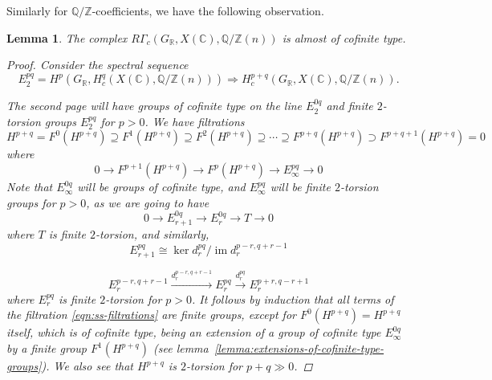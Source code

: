 \documentclass[leqno,12pt]{article}
\theoremstyle{plain}
\newtheorem{lemma}[theorem]{\indent\sc Lemma}
\theoremstyle{definition}
\DeclareMathOperator{\im}{im}
\newcommand{\CC}{\mathbb{C}}
\newcommand{\QQ}{\mathbb{Q}}
\newcommand{\RR}{\mathbb{R}}
\newcommand{\ZZ}{\mathbb{Z}}
\begin{document}
Similarly for $\QQ/\ZZ$-coefficients, we have the following observation.

\begin{lemma}
  \label{lemma:RGammac(GR,X(C),Q/Z(n))-almost-cofinite-type}
  The complex $R\Gamma_c (G_\RR, X (\CC), \QQ/\ZZ (n))$
  is almost of cofinite type.

  \begin{proof}
    Consider the spectral sequence
    \[ E_2^{pq} = H^p (G_\RR, H^q_c (X (\CC), \QQ/\ZZ (n)))
    \Longrightarrow
    H^{p+q}_c (G_\RR, X (\CC), \QQ/\ZZ (n)). \]

    The second page will have groups of cofinite type on the line $E_2^{0q}$ and
    finite $2$-torsion groups $E_2^{pq}$ for $p > 0$. We have filtrations
    \begin{equation}
      \label{eqn:ss-filtrations}
      H^{p+q} = F^0 (H^{p+q}) \supseteq
      F^1 (H^{p+q}) \supseteq
      F^2 (H^{p+q}) \supseteq \cdots \supseteq
      F^{p+q} (H^{p+q}) \supset F^{p+q+1} (H^{p+q}) = 0
    \end{equation}
    where
    $$0 \to F^{p+1} (H^{p+q}) \to F^p (H^{p+q}) \to E_\infty^{pq} \to 0$$
    Note that $E^{0q}_\infty$ will be groups of cofinite type, and
    $E^{pq}_\infty$ will be finite $2$-torsion groups for $p > 0$, as we are
    going to have
    $$0 \to E_{r+1}^{0q} \to E_r^{0q} \to T \to 0$$
    where $T$ is finite $2$-torsion, and similarly,
    $$E_{r+1}^{pq} \cong \ker d_r^{pq} / \im d_r^{p-r,q+r-1}$$

    \[ E_r^{p-r,q+r-1} \xrightarrow{d_r^{p-r,q+r-1}}
    E_r^{pq} \xrightarrow{d_r^{pq}} E_r^{p+r,q-r+1} \]
    where $E_r^{pq}$ is finite $2$-torsion for $p > 0$. It follows by induction
    that all terms of the filtration \eqref{eqn:ss-filtrations} are finite
    groups, except for $F^0 (H^{p+q}) = H^{p+q}$ itself, which is of cofinite
    type, being an extension of a group of cofinite type $E_\infty^{0q}$ by a
    finite group $F^1 (H^{p+q})$
    (see lemma~\ref{lemma:extensions-of-cofinite-type-groups}). We also see that
    $H^{p+q}$ is $2$-torsion for $p+q \gg 0$.
  \end{proof}
\end{lemma}
\end{document}
